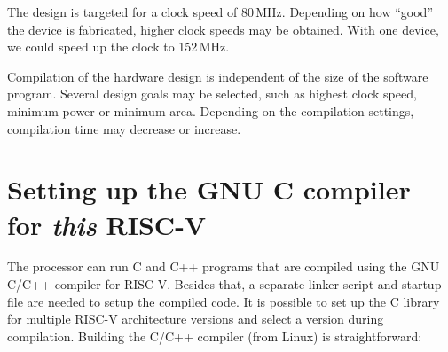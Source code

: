 \documentclass[12pt]{article}
\begin{document}
The design is targeted for a clock speed of 80\,MHz. Depending on how ``good'' the device is fabricated, higher clock speeds may be obtained. With one device, we could speed up the clock to 152\,MHz.

Compilation of the hardware design is independent of the size of the software program. Several design goals may be selected, such as highest clock speed, minimum power or minimum area. Depending on the compilation settings, compilation time may decrease or increase.


\section{Setting up the GNU C compiler for \textit{this} RISC-V}
\label{sec:ccompiler}
The processor can run C and C++ programs that are compiled using the GNU C/C++ compiler for RISC-V. Besides that, a separate linker script and startup file are needed to setup the compiled code. It is possible to set up the C library for multiple RISC-V architecture versions and select a version during compilation. Building the C/C++ compiler (from Linux) is straightforward:
\end{document}
